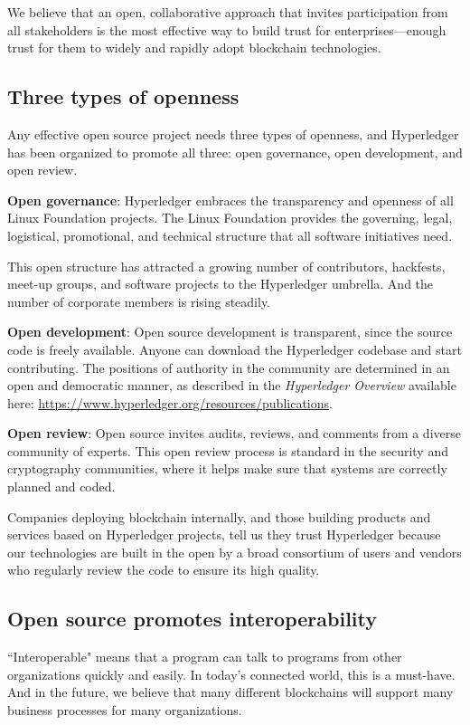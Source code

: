 We believe that an open, collaborative approach that invites participation from all stakeholders is the most effective way to build trust for enterprises---enough trust for them to widely and rapidly adopt blockchain technologies. 

\subsection{Three types of openness}
Any effective open source project needs three types of openness, and Hyperledger has been organized to promote all three: open governance, open development, and open review.

\textbf{Open governance}: 
Hyperledger embraces the transparency and openness of all Linux Foundation projects. 
The Linux Foundation provides the governing, legal, logistical, promotional, and technical structure that all software initiatives need. 

This open structure has attracted a growing number of contributors, hackfests, meet-up groups, and software projects to the Hyperledger umbrella. 
And the number of corporate members is rising steadily. 

\textbf{Open development}: 
Open source development is transparent, since the source code is freely available. Anyone can download the Hyperledger codebase and start contributing. The positions of authority in the community are determined in an open and democratic manner, as described in the \emph{Hyperledger Overview} available here: \url{https://www.hyperledger.org/resources/publications}.

\textbf{Open review}:
Open source invites audits, reviews, and comments from a diverse community of experts. 
This open review process is standard in the security and cryptography communities, where it helps make sure that systems are correctly planned and coded. 

Companies deploying blockchain internally, and those building products and services based on Hyperledger projects, tell us they trust Hyperledger because our technologies are built in the open by a broad consortium of users and vendors who regularly review the code to ensure its high quality. 

\subsection{Open source promotes interoperability}
``Interoperable" means that a program can talk to programs from other organizations quickly and easily. In today's connected world, this is a must-have.
And in the future, we believe that many different blockchains will support many business processes for many organizations. 


